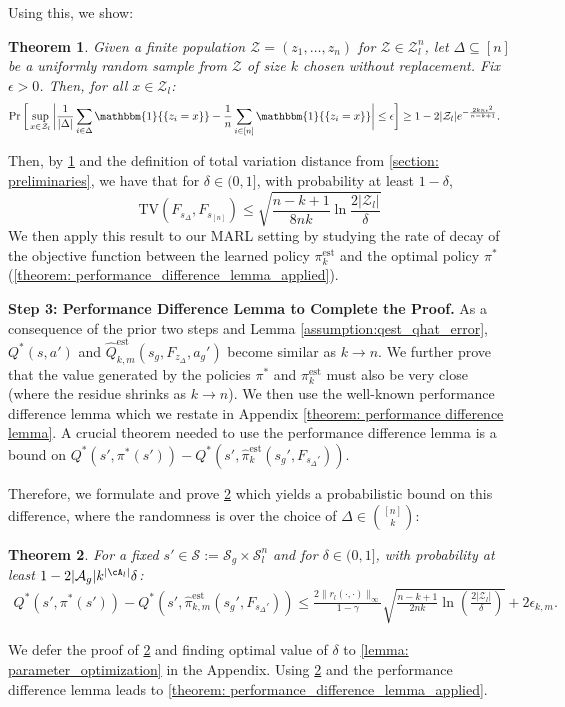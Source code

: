 \documentclass{article}
\theoremstyle{plain}
\newtheorem{theorem}{Theorem}[section]
\theoremstyle{definition}
\def\est{\mathrm{est}}
\begin{document}
Using this, we show:
\begin{theorem}\label{thm:tvd}Given a finite population $\mathcal{Z}=(z_1,\dots,z_n)$ for $\mathcal{Z}\in\mathcal{Z}_l^n$, let $\Delta\subseteq[n]$ be a uniformly random sample from $\mathcal{Z}$ of size $k$ chosen without replacement. Fix $\epsilon>0$. Then, for all $x\in\mathcal{Z}_l$:
\begin{align*}\Pr\bigg[\sup_{x\in\mathcal{Z}_l}\bigg|\frac{1}{|\Delta|}\sum_{i\in\Delta}\mathbbm{1}{\{z_i = x\}} &- \frac{1}{n}\sum_{i\in[n]}\mathbbm{1}{\{z_i = x\}}\bigg|\leq \epsilon\bigg] \geq 1 - 2|\mathcal{Z}_l|e^{-\frac{2kn\epsilon^2}{n-k+1}}.\end{align*}
\end{theorem}
Then, by \cref{thm:tvd} and the definition of total variation distance from \cref{section: preliminaries}, we have that for $\delta\in(0,1]$, with probability at least $1-\delta$,
\begin{equation}\mathrm{TV}(F_{s_\Delta}, F_{s_{[n]}})\leq\sqrt{\frac{n-k+1}{8nk}\ln \frac{ 2|\mathcal{Z}_l|}{\delta}}\end{equation}
We then apply this result to our MARL setting by studying the rate of decay of the objective function between the learned policy ${\pi}_{k}^\est$ and the optimal policy $\pi^*$ (\cref{theorem: performance_difference_lemma_applied}).

\textbf{Step 3: Performance Difference Lemma to Complete the Proof.} As a consequence of the prior two steps and Lemma \ref{assumption:qest_qhat_error}, $Q^*(s,a')$ and $\hat{Q}_{k,m}^\est(s_g,F_{z_\Delta},a_g')$ become similar as $k\to n$. We further prove that the value generated by the policies $\pi^*$ and ${\pi}_{k}^\est$ must also be very close (where the residue shrinks as $k \to n$). We then use the well-known performance difference lemma \citep{Kakade+Langford:2002} which we restate in Appendix \ref{theorem: performance difference lemma}. A crucial theorem needed to use the performance difference lemma is a bound on $Q^*(s',\pi^*(s')) - Q^*(s',\hat{\pi}_{k}^\est(s_g',F_{s_\Delta'}))$. 

Therefore, we formulate and prove \cref{thm:q_diff_actions} which yields a probabilistic bound on this difference, where the randomness is over the choice of $\Delta\in\binom{[n]}{k}$:

\begin{theorem}\label{thm:q_diff_actions}
For a fixed $s'\in\mathcal{S}:=\mathcal{S}_g\times\mathcal{S}_l^n$ and for $\delta\in (0,1]$, with probability at least $1 - 2|\mathcal{A}_g|k^{|\cA_l|}\delta$:
\begin{align*}Q^*(s',\pi^*(s')) - Q^*(s',\hat{\pi}_{k,m}^\est(s_g',F_{s_\Delta'}))\leq\frac{2\|r_l(\cdot,\cdot)\|_\infty}{1-\gamma}\sqrt{\frac{n-k+1}{2nk}\ln\left( \frac{2|\mathcal{Z}_l|}{\delta}\right)}+ 2\epsilon_{k,m}.
\end{align*}
\end{theorem}
We defer the proof of \cref{thm:q_diff_actions}
and finding optimal value of $\delta$ to \cref{lemma: parameter_optimization} in the Appendix. Using \cref{thm:q_diff_actions} and the performance difference lemma leads to \cref{theorem: performance_difference_lemma_applied}.
\end{document}
